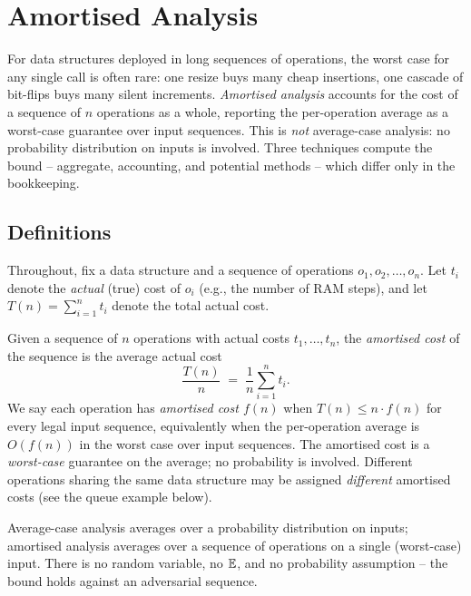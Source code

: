 \section{Amortised Analysis}
\label{sec:amortised}

For data structures deployed in long sequences of operations, the worst case for any single call is often rare: one resize buys many cheap insertions, one cascade of bit-flips buys many silent increments. \emph{Amortised analysis} accounts for the cost of a sequence of $n$ operations as a whole, reporting the per-operation average as a worst-case guarantee over input sequences. This is \emph{not} average-case analysis: no probability distribution on inputs is involved. Three techniques compute the bound -- aggregate, accounting, and potential methods -- which differ only in the bookkeeping.

\subsection{Definitions}

Throughout, fix a data structure and a sequence of operations $o_1, o_2, \dots, o_n$. Let $t_i$ denote the \emph{actual} (true) cost of $o_i$ (e.g., the number of RAM steps), and let $T(n) = \sum_{i=1}^n t_i$ denote the total actual cost.

\begin{definition}
\label{def:amortised_cost}
Given a sequence of $n$ operations with actual costs $t_1, \dots, t_n$, the \emph{amortised cost} of the sequence is the average actual cost
\[
  \frac{T(n)}{n} \;=\; \frac{1}{n}\sum_{i=1}^{n} t_i.
\]
We say each operation has \emph{amortised cost $f(n)$} when $T(n) \le n \cdot f(n)$ for every legal input sequence, equivalently when the per-operation average is $O(f(n))$ in the worst case over input sequences. The amortised cost is a \emph{worst-case} guarantee on the average; no probability is involved. Different operations sharing the same data structure may be assigned \emph{different} amortised costs (see the queue example below).
\end{definition}

\begin{remark}
Average-case analysis averages over a probability distribution on inputs; amortised analysis averages over a sequence of operations on a single (worst-case) input. There is no random variable, no $\operatorname{\mathbb{E}}$, and no probability assumption -- the bound holds against an adversarial sequence.
\end{remark}

